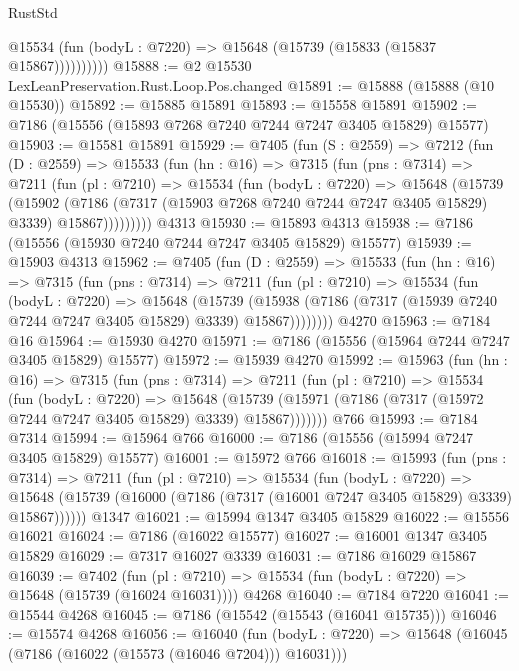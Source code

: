 \begin{lexlean}{RustStd}
\begin{coremodule}
              @15534 (fun (bodyL : @7220) => @15648 (@15739 (@15833 (@15837 @15867))))))))))
@15888 := @2 @15530 LexLeanPreservation.Rust.Loop.Pos.changed
@15891 := @15888 (@15888 (@10 @15530))
@15892 := @15885 @15891
@15893 := @15558 @15891
@15902 := @7186 (@15556 (@15893 @7268 @7240 @7244 @7247 @3405 @15829) @15577)
@15903 := @15581 @15891
@15929 := @7405
    (fun (S : @2559) =>
    @7212
      (fun (D : @2559) =>
      @15533
        (fun (hn : @16) =>
        @7315
          (fun (pns : @7314) =>
          @7211
            (fun (pl : @7210) =>
            @15534
              (fun (bodyL : @7220) =>
              @15648
                (@15739
                  (@15902
                    (@7186
                      (@7317 (@15903 @7268 @7240 @7244 @7247 @3405 @15829) @3339)
                      @15867)))))))))
    @4313
@15930 := @15893 @4313
@15938 := @7186 (@15556 (@15930 @7240 @7244 @7247 @3405 @15829) @15577)
@15939 := @15903 @4313
@15962 := @7405
    (fun (D : @2559) =>
    @15533
      (fun (hn : @16) =>
      @7315
        (fun (pns : @7314) =>
        @7211
          (fun (pl : @7210) =>
          @15534
            (fun (bodyL : @7220) =>
            @15648
              (@15739
                (@15938 (@7186 (@7317 (@15939 @7240 @7244 @7247 @3405 @15829) @3339) @15867))))))))
    @4270
@15963 := @7184 @16
@15964 := @15930 @4270
@15971 := @7186 (@15556 (@15964 @7244 @7247 @3405 @15829) @15577)
@15972 := @15939 @4270
@15992 := @15963
    (fun (hn : @16) =>
    @7315
      (fun (pns : @7314) =>
      @7211
        (fun (pl : @7210) =>
        @15534
          (fun (bodyL : @7220) =>
          @15648
            (@15739 (@15971 (@7186 (@7317 (@15972 @7244 @7247 @3405 @15829) @3339) @15867)))))))
    @766
@15993 := @7184 @7314
@15994 := @15964 @766
@16000 := @7186 (@15556 (@15994 @7247 @3405 @15829) @15577)
@16001 := @15972 @766
@16018 := @15993
    (fun (pns : @7314) =>
    @7211
      (fun (pl : @7210) =>
      @15534
        (fun (bodyL : @7220) =>
        @15648 (@15739 (@16000 (@7186 (@7317 (@16001 @7247 @3405 @15829) @3339) @15867))))))
    @1347
@16021 := @15994 @1347 @3405 @15829
@16022 := @15556 @16021
@16024 := @7186 (@16022 @15577)
@16027 := @16001 @1347 @3405 @15829
@16029 := @7317 @16027 @3339
@16031 := @7186 @16029 @15867
@16039 := @7402
    (fun (pl : @7210) => @15534 (fun (bodyL : @7220) => @15648 (@15739 (@16024 @16031))))
    @4268
@16040 := @7184 @7220
@16041 := @15544 @4268
@16045 := @7186 (@15542 (@15543 (@16041 @15735)))
@16046 := @15574 @4268
@16056 := @16040
    (fun (bodyL : @7220) => @15648 (@16045 (@7186 (@16022 (@15573 (@16046 @7204))) @16031)))

\end{coremodule}
\end{lexlean}
